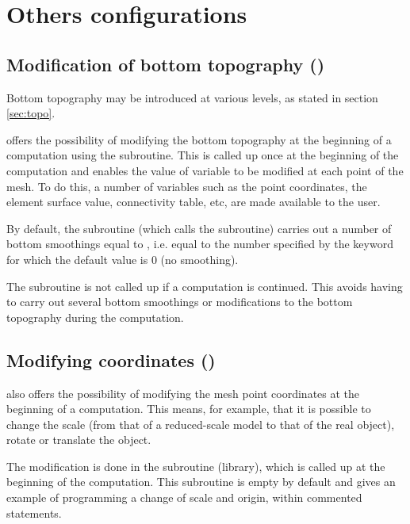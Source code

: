 \chapter{Others configurations}

\section{Modification of bottom topography ()}

Bottom topography may be introduced at various levels, as stated in section
\ref{sec:topo}.

 offers the possibility of modifying the bottom topography at the
beginning of a computation using the  subroutine. This is
called up once at the beginning of the computation and enables the value of
variable  to be modified at each point of the mesh. To do this, a number of
variables such as the point coordinates, the element surface value,
connectivity table, etc, are made available to the user.

By default, the  subroutine (which calls the
 subroutine) carries out a number of bottom
smoothings equal to , i.e. equal to the number specified by the keyword
 for which the default value is 0 (no
smoothing).

The  subroutine is not called up if a computation is continued.
This avoids having to carry out several bottom smoothings or modifications to
the bottom topography during the computation.


\section{Modifying coordinates ()}

 also offers the possibility of modifying the mesh point coordinates
at the beginning of a computation. This means, for example, that it is possible
to change the scale (from that of a reduced-scale model to that of the real
object), rotate or translate the object.

The modification is done in the  subroutine (\bief library),
which is called up at the beginning of the computation. This subroutine is empty by
default and gives an example of programming a change of scale and origin,
within commented statements.

